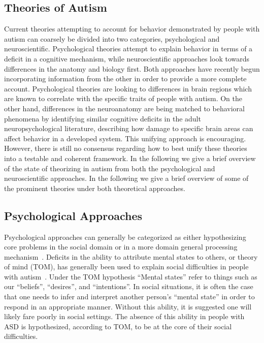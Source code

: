 % 
% 

\subsection{Theories of Autism}
Current theories attempting to account for behavior demonstrated by people with autism can coarsely be divided into two categories, psychological and neuroscientific.  Psychological theories attempt to explain behavior in terms of a deficit in a cognitive mechanism, while neuroscientific approaches look towards differences in the anatomy and biology first.  Both approaches have recently begun incorporating information from the other in order to provide a more complete account.  Psychological theories are looking to differences in brain regions which are known to correlate with the specific traits of people with autism.  On the other hand, differences in the neuroanatomy are being matched to behavioral phenomena by identifying similar cognitive deficits in the adult neuropsychological literature, describing how damage to specific brain areas can affect behavior in a developed system.  This unifying approach is encouraging. However, there is still no consensus regarding how to best unify these theories into a testable and coherent framework.  In the following we give a brief overview of the state of theorizing in autism from both the psychological and neuroscientific approaches. In the following we give a brief overview of some of the prominent theories under both theoretical approaches.
	
\subsection{Psychological Approaches}
	Psychological approaches can generally be categorized as either hypothesizing core problems in the social domain or in a more domain general processing mechanism~\cite{RefWorks:85}.  Deficits in the ability to attribute mental states to others, or theory of mind (TOM), has generally been used to explain social difficulties in people with autism~\cite{Baron-Cohen:1985:AutismTOM}.  Under the TOM hypothesis ``Mental states'' refer to things such as our ``beliefs'', ``desires'', and ``intentions''.   In social situations, it is often the case that one needs to infer and interpret another person's ``mental state'' in order to respond in an appropriate manner.  Without this ability, it is suggested one will likely fare poorly in social settings.  The absence of this ability in people with ASD is hypothesized, according to TOM, to be at the core of their social difficulties. 

